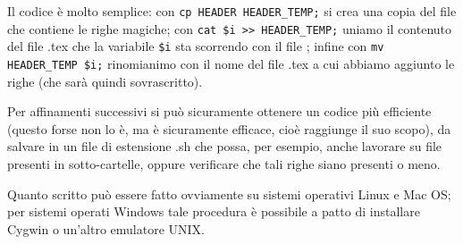 Il codice è molto semplice: con \verb!cp HEADER HEADER_TEMP;! si crea una copia del file che contiene le righe magiche; con \verb!cat $i >> HEADER_TEMP;! uniamo il contenuto del file .tex che la variabile \verb!$i! sta scorrendo con il file ; infine con \verb!mv HEADER_TEMP $i;! rinomianimo  con il nome del file .tex a cui abbiamo aggiunto le righe (che sarà quindi sovrascritto).

Per affinamenti successivi si può sicuramente ottenere un codice più efficiente (questo forse non lo è, ma è sicuramente efficace, cioè raggiunge il suo scopo), da salvare in un file di estensione .sh che possa, per esempio, anche lavorare su file presenti in sotto-cartelle, oppure verificare che tali righe siano presenti o meno. 

Quanto scritto può essere fatto ovviamente su sistemi operativi Linux e Mac OS; per sistemi operati Windows tale procedura è possibile a patto di installare Cygwin o un'altro emulatore UNIX.


\endinput

\section{Creazione di cartelle ramificate}
\section{Aprire il terminale da una cartella}
\section{Redirezione dei dati}
\section{Operare con i diritti di root}
\section{Scripting}

\endinput

\begin{verbatim}
$ rename 'y/A-Z/a-z/' image/*
\end{verbatim}

Su tutti i sistemi il comando per cambiare la directory di lavoro della shell è \texttt{cd} che sta per \textbf{c}hange \textbf{d}irectory:

\begin{tcolorbox}
\begin{verbatim}
$ cd <path>
\end{verbatim}
\end{tcolorbox}

